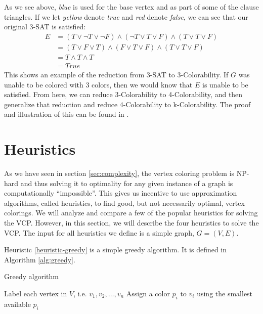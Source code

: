 \documentclass{article}
\newcounter{heuristic} \setcounter{heuristic}{0}
\theoremstyle{definition}
\begin{document}
As we see above, \emph{blue} is used for the base vertex and as part of some of the clause triangles. If we let \emph{yellow} denote \emph{true} and \emph{red} denote \emph{false}, we can see that our original 3-SAT is satisfied:
%
\begin{align*}
E &= \left( T \vee \neg T \vee \neg F \right) \wedge \left( \neg T \vee T \vee F \right) \wedge \left(T \vee T \vee F \right) \\
&= \left( T \vee F \vee T \right) \wedge \left( F \vee T \vee F \right) \wedge \left(T \vee T \vee F \right) \\
&= T \wedge T \wedge T \\
&= True
\end{align*}
%
This shows an example of the reduction from 3-SAT to 3-Colorability. If \(G\) was unable to be colored with 3 colors, then we would know that \(E\) is unable to be satisfied. From here, we can reduce 3-Colorability to 4-Colorability, and then generalize that reduction and reduce 4-Colorability to k-Colorability. The proof and illustration of this can be found in \citet{sharma}.

\section{Heuristics}
As we have seen in section \ref{sec:complexity}, the vertex coloring problem is NP-hard and thus solving it to optimality for any given instance of a graph is computationally ``impossible''. This gives us incentive to use approximation algorithms, called heuristics, to find good, but not necessarily optimal, vertex colorings. We will analyze and compare a few of the popular heuristics for solving the VCP. However, in this section, we will describe the four heuristics to solve the VCP. The input for all heuristics we define is a simple graph, $G = (V, E)$.

\newpage

\label{heuristic-greedy}

Heuristic \ref{heuristic-greedy} is a simple greedy algorithm. It is defined in Algorithm \ref{alg:greedy}.

\begin{algorithm}
\caption{Greedy algorithm}\label{alg:greedy}
\begin{algorithmic}[1]
\State Label each vertex in $V$, i.e. $v_1, v_2, \dots, v_n$
\State Assign a color $p_i$ to $v_i$ using the smallest available $p_i$
\EndFor
\end{algorithmic}
\end{algorithm}
\end{document}
